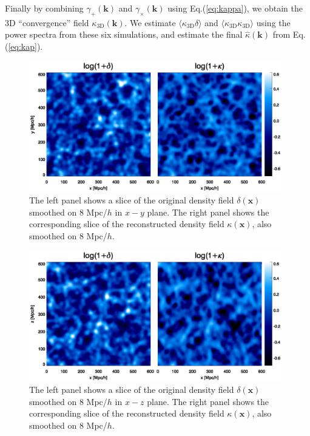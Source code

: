 \documentclass[aps,prd,twocolumn,showpacs,superscriptaddress,groupedaddress,nofootinbib]{revtex4}  %
\newcommand{\mr}{\mathrm}
\begin{document}
Finally by combining $\gamma_+(\bm{k})$ and $\gamma_\times(\bm{k})$ using
Eq.(\ref{eq:kappa}), we obtain the 3D ``convergence'' field 
$\kappa_\mr{3D}(\bm{k})$. We estimate $\langle\kappa_\mr{3D}\delta\rangle$ and 
$\langle\kappa_\mr{3D}\kappa_\mr{3D}\rangle$ using the power spectra from these 
six simulations, and estimate the final $\hat{\kappa}(\bm{k})$ from 
Eq.(\ref{eq:kap}).

\begin{figure}[tbp]
\begin{center}
\includegraphics[width=0.98\textwidth]{f1.eps}
\end{center}
\vspace{-0.6cm}
\caption{\label{fig:denxy} The left panel shows a slice of the original density
field $\delta(\bm{x})$ smoothed on 8 Mpc/$h$ in $x-y$ plane. 
The right panel shows the corresponding slice of the reconstructed density 
field $\kappa(\bm{x})$, also smoothed on 8 Mpc/$h$. }
 \end{figure}

\begin{figure}[tbp]
\begin{center}
\includegraphics[width=0.98\textwidth]{f2.eps}
\end{center}
\vspace{-0.6cm}
\caption{\label{fig:denxz} 
The left panel shows a slice of the original density field $\delta(\bm{x})$ smoothed on 8 Mpc/$h$ in $x-z$ plane. 
The right panel shows the corresponding slice of the reconstructed density 
field $\kappa(\bm{x})$, also smoothed on 8 Mpc/$h$. }
\end{figure}
\end{document}
